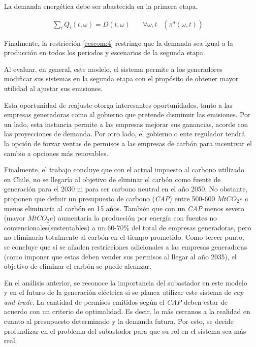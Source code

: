 La demanda energética debe ser abastecida en la primera etapa.

\begin{align}
    \sum_{i}Q_i(t,\omega) = D(t,\omega) \quad& \forall  \omega,t & (\pi^d (\omega,t))\label{rescom:4}
\end{align}

Finalmente, la restricción \ref{rescom:4} restringe que la demanda sea igual a la producción en todos los periodos y escenarios de la segunda etapa.
\vspace{2.5mm}

Al evaluar, en general, este modelo, el sistema permite a los generadores modificar sus sistemas en la segunda etapa con el propósito de obtener mayor utilidad al ajustar sus emisiones.
\vspace{2.5mm}

Esta oportunidad de reajuste otorga interesantes oportunidades, tanto a las empresas generadoras como al gobierno que pretende disminuir las emisiones. Por un lado, esta instancia permite a las empresas mejorar sus ganancias, acorde con las proyecciones de demanda. Por otro lado, el gobierno o ente regulador tendrá la opción de forzar ventas de permisos a las empresas de carbón para incentivar el cambio a opciones más renovables. 
\vspace{2.5mm}

Finalmente, el trabajo concluye que con el actual impuesto al carbono utilizado en Chile, no se llegaría al objetivo de eliminar el carbón como fuente de generación para el 2030 ni para ser carbono neutral en el año 2050. No obstante, proponen que definir un presupuesto de carbono (\textit{CAP}) entre 500-600 $MtCO_2 e$ o menos eliminaría al carbón en 15 años. También que con un \textit{CAP} menos severo (mayor $MtCO_2 e$) aumentaría la producción por energía con fuentes no convencionales(sustentables) a un 60-70\% del total de empresas generadoras, pero no eliminaría totalmente al carbón en el tiempo prometido. Como tercer punto, se concluye que si se añaden restricciones adicionales a las empresas generadoras (como imponer que estas deben vender sus permisos al llegar al año 2035), el objetivo de eliminar el carbón se puede alcanzar.
\vspace{2.5mm}

En el análisis anterior, se reconoce la importancia del subastador en este modelo y en el futuro de la generación eléctrica si se planea utilizar este sistema de \textit{cap and trade}. La cantidad de permisos emitidos según el \textit{CAP} deben estar de acuerdo con un criterio de optimalidad. Es decir, lo más cercanos a la realidad en cuanto al presupuesto determinado y la demanda futura. Por esto, se decide profundizar en el problema del subastador para que su rol en el sistema sea más real.
\vspace{2.5mm}

